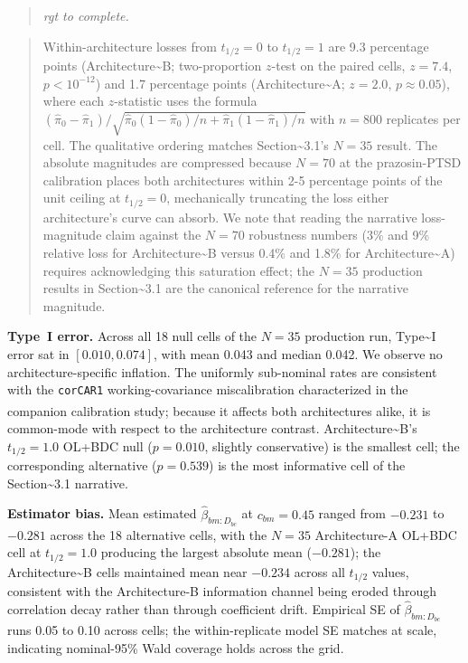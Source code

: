 \documentclass[
  11pt,
]{article}
\newenvironment{rgt}{%
  \begin{quote}\small\itshape\color[RGB]{20,60,160}}{%
  \end{quote}}
\newenvironment{orig}{%
  \begin{quote}\normalsize\color[gray]{0.55}}{%
  \end{quote}}
\begin{document}
\begin{rgt}
rgt to complete.

\end{rgt}

\begin{orig}
Within-architecture losses from \(t_{1/2} = 0\) to \(t_{1/2} = 1\) are
9.3 percentage points (Architecture\textasciitilde B; two-proportion
\(z\)-test on the paired cells, \(z = 7.4\), \(p < 10^{-12}\)) and 1.7
percentage points (Architecture\textasciitilde A; \(z = 2.0\),
\(p \approx 0.05\)), where each \(z\)-statistic uses the formula
\((\hat{\pi}_0 - \hat{\pi}_1) /
\sqrt{\hat{\pi}_0(1-\hat{\pi}_0)/n + \hat{\pi}_1(1-\hat{\pi}_1)/n}\)
with \(n = 800\) replicates per cell. The qualitative ordering matches
Section\textasciitilde3.1's \(N = 35\) result. The absolute magnitudes
are compressed because \(N = 70\) at the prazosin-PTSD calibration
places both architectures within 2-5 percentage points of the unit
ceiling at \(t_{1/2} = 0\), mechanically truncating the loss either
architecture's curve can absorb. We note that reading the narrative
loss-magnitude claim against the \(N = 70\) robustness numbers (3\% and
9\% relative loss for Architecture\textasciitilde B versus 0.4\% and
1.8\% for Architecture\textasciitilde A) requires acknowledging this
saturation effect; the \(N = 35\) production results in
Section\textasciitilde3.1 are the canonical reference for the narrative
magnitude.

\end{orig}

\textbf{Type~I error.} Across all 18 null cells of the \(N = 35\)
production run, Type\textasciitilde I error sat in \([0.010, 0.074]\),
with mean 0.043 and median 0.042. We observe no architecture-specific
inflation. The uniformly sub-nominal rates are consistent with the
\texttt{corCAR1} working-covariance miscalibration characterized in the
companion calibration
study\textsuperscript{}; because it
affects both architectures alike, it is common-mode with respect to the
architecture contrast. Architecture\textasciitilde B's \(t_{1/2} = 1.0\)
OL+BDC null (\(p = 0.010\), slightly conservative) is the smallest cell;
the corresponding alternative (\(p = 0.539\)) is the most informative
cell of the Section\textasciitilde3.1 narrative.

\textbf{Estimator bias.} Mean estimated \(\hat\beta_{bm{:}D_{bc}}\) at
\(c_{bm} = 0.45\) ranged from \(-0.231\) to \(-0.281\) across the 18
alternative cells, with the \(N = 35\) Architecture-A OL+BDC cell at
\(t_{1/2} = 1.0\) producing the largest absolute mean (\(-0.281\)); the
Architecture\textasciitilde B cells maintained mean near \(-0.234\)
across all \(t_{1/2}\) values, consistent with the Architecture-B
information channel being eroded through correlation decay rather than
through coefficient drift. Empirical SE of \(\hat\beta_{bm{:}D_{bc}}\)
runs 0.05 to 0.10 across cells; the within-replicate model SE matches at
scale, indicating nominal-95\% Wald coverage holds across the grid.
\end{document}
